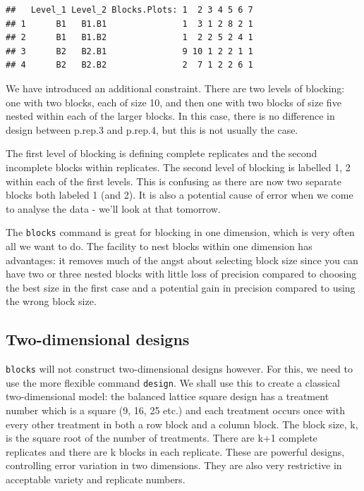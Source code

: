 \documentclass[
]{book}
\begin{document}
\begin{verbatim}
##   Level_1 Level_2 Blocks.Plots: 1  2 3 4 5 6 7
## 1      B1   B1.B1               1  3 1 2 8 2 1
## 2      B1   B1.B2               1  2 2 5 2 4 1
## 3      B2   B2.B1               9 10 1 2 2 1 1
## 4      B2   B2.B2               2  7 1 2 2 6 1
\end{verbatim}

We have introduced an additional constraint. There are two levels of blocking: one with two blocks, each of size 10, and then one with two blocks of size five nested within each of the larger blocks. In this case, there is no difference in design between p.rep.3 and p.rep.4, but this is not usually the case.

The first level of blocking is defining complete replicates and the second incomplete blocks within replicates. The second level of blocking is labelled 1, 2 within each of the first levels. This is confusing as there are now two separate blocks both labeled 1 (and 2). It is also a potential cause of error when we come to analyse the data - we'll look at that tomorrow.

The \texttt{blocks} command is great for blocking in one dimension, which is very often all we want to do. The facility to nest blocks within one dimension has advantages: it removes much of the angst about selecting block size since you can have two or three nested blocks with little loss of precision compared to choosing the best size in the first case and a potential gain in precision compared to using the wrong block size.

\hypertarget{two-dimensional-designs}{%
\subsection{Two-dimensional designs}\label{two-dimensional-designs}}

\texttt{blocks} will not construct two-dimensional designs however. For this, we need to use the more flexible command \texttt{design}. We shall use this to create a classical two-dimensional model: the balanced lattice square design has a treatment number which is a square (9, 16, 25 etc.) and each treatment occurs once with every other treatment in both a row block and a column block. The block size, k, is the square root of the number of treatments. There are k+1 complete replicates and there are k blocks in each replicate. These are powerful designs, controlling error variation in two dimensions. They are also very restrictive in acceptable variety and replicate numbers.
\end{document}

